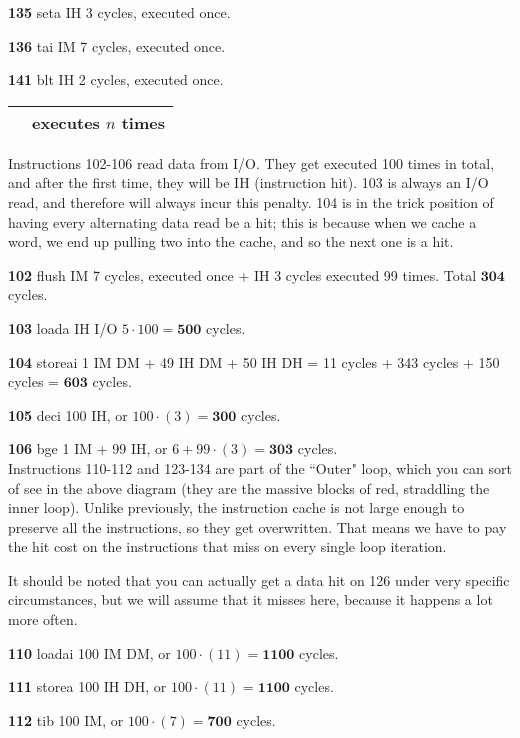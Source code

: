 \documentclass[a4paper]{article}
\begin{document}
\textbf{135} seta IH 3 cycles, executed once.

\textbf{136} tai IM 7 cycles, executed once.

\textbf{141} blt IH 2 cycles, executed once. \\

\begin{tabular}{|c|c|}
\hline
\cellcolor{red} & executes $n$ times \\
\hline
\end{tabular}

Instructions 102-106 read data from I/O. They get executed 100 times in total, and after the first time, they will be IH (instruction hit). 103 is always an I/O read, and therefore will always incur this penalty. 104 is in the trick position of having every alternating data read be a hit; this is because when we cache a word, we end up pulling two into the cache, and so the next one is a hit.

\textbf{102} flush IM 7 cycles, executed once + IH 3 cycles executed 99 times. Total $\mathbf{304}$ cycles.

\textbf{103} loada IH I/O $5 \cdot 100  = \mathbf{500}$ cycles.

\textbf{104} storeai 1 IM DM + 49 IH DM + 50 IH DH = 11 cycles + 343 cycles + 150 cycles = $\mathbf{603}$ cycles.

\textbf{105} deci 100 IH, or $100 \cdot (3) = \mathbf{300}$ cycles.

\textbf{106} bge 1 IM + 99 IH, or $6 + 99 \cdot (3) = \mathbf{303}$ cycles. \\

Instructions 110-112 and 123-134 are part of the ``Outer" loop, which you can sort of see in the above diagram (they are the massive blocks of red, straddling the inner loop). Unlike previously, the instruction cache is not large enough to preserve all the instructions, so they get overwritten. That means we have to pay the hit cost on the instructions that miss on every single loop iteration.

It should be noted that you can actually get a data hit on 126 under very specific circumstances, but we will assume that it misses here, because it happens a lot more often.

\textbf{110} loadai 100 IM DM, or $100 \cdot (11) = \mathbf{1100}$ cycles.

\textbf{111} storea 100 IH DH, or $100 \cdot (11) = \mathbf{1100}$ cycles.

\textbf{112} tib 100 IM, or $100 \cdot (7) = \mathbf{700}$ cycles.
\end{document}
